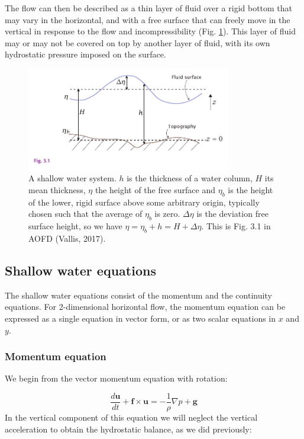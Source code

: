 \documentclass[12pt]{article}
\numberwithin{equation}{section}
\numberwithin{figure}{section}
\numberwithin{table}{section}
\begin{document}
The flow can then be described as a thin layer of fluid over a rigid bottom
that may vary in the horizontal, and with a free surface that can freely
move in the vertical in response to the flow and incompressibility
(Fig. \ref{fig:shallow_water1}).
This layer of fluid may or may not be covered on top by another layer of fluid,
with its own hydrostatic pressure imposed on the surface.

\begin{figure}[h]
  \centering
  \includegraphics[width=0.8\textwidth]{assets/fig_shallow_water1.pdf}
  \caption{
    A shallow water system.
    $h$ is the thickness of a water column, $H$ its mean thickness, $\eta$ the
    height of the free surface and $\eta_b$ is the height of the lower, rigid
    surface above some arbitrary origin, typically chosen such that the average
    of $\eta_b$ is zero.
    $\Delta \eta$ is the deviation free surface height, so we have
    $\eta = \eta_b + h = H + \Delta \eta$.
    This is Fig. 3.1 in AOFD (Vallis, 2017).
  }
  \label{fig:shallow_water1}
\end{figure}

\subsection{Shallow water equations}

The shallow water equations consist of the momentum and the continuity
equations.
For 2-dimensional horizontal flow, the momentum equation can be expressed as
a single equation in vector form, or as two scalar equations in $x$ and $y$.

\subsubsection{Momentum equation}

We begin from the vector momentum equation with rotation:

\begin{equation}
  \frac{d \mathbf{u}}{dt} + \mathbf{f} \times \mathbf{u} =
  - \frac{1}{\rho} \nabla p + \mathbf{g}
  \label{eq:shallow_water_momentum1}
\end{equation}
In the vertical component of this equation we will neglect the vertical
acceleration to obtain the hydrostatic balance, as we did previously:
\end{document}
